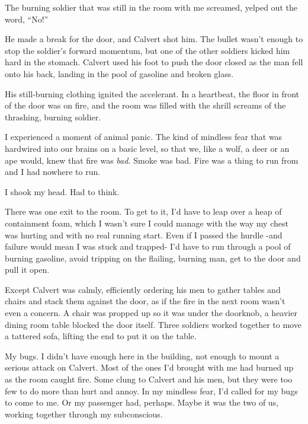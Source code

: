 The burning soldier that was still in the room with me screamed, yelped out the word, ``No!''



He made a break for the door, and Calvert shot him.  The bullet wasn't enough to stop the soldier's forward momentum, but one of the other soldiers kicked him hard in the stomach.  Calvert used his foot to push the door closed as the man fell onto his back, landing in the pool of gasoline and broken glass.



His still-burning clothing ignited the accelerant.  In a heartbeat, the floor in front of the door was on fire, and the room was filled with the shrill screams of the thrashing, burning soldier.



I experienced a moment of animal panic.  The kind of mindless fear that was hardwired into our brains on a basic level, so that we, like a wolf, a deer or an ape would, knew that fire was \emph{bad.}  Smoke was bad.  Fire was a thing to run from and I had nowhere to run.



I shook my head.  Had to think.



There was one exit to the room.  To get to it, I'd have to leap over a heap of containment foam, which I wasn't sure I could manage with the way my chest was hurting and with no real running start.  Even if I passed the hurdle -and failure would mean I was stuck and trapped- I'd have to run through a pool of burning gasoline, avoid tripping on the flailing, burning man, get to the door and pull it open.



Except Calvert was calmly, efficiently ordering his men to gather tables and chairs and stack them against the door, as if the fire in the next room wasn't even a concern.  A chair was propped up so it was under the doorknob, a heavier dining room table blocked the door itself.  Three soldiers worked together to move a tattered sofa, lifting the end to put it on the table.



My bugs.  I didn't have enough here in the building, not enough to mount a serious attack on Calvert.  Most of the ones I'd brought with me had burned up as the room caught fire.  Some clung to Calvert and his men, but they were too few to do more than hurt and annoy.  In my mindless fear, I'd called for my bugs to come to me.  Or my passenger had, perhaps.  Maybe it was the two of us, working together through my subconscious.



